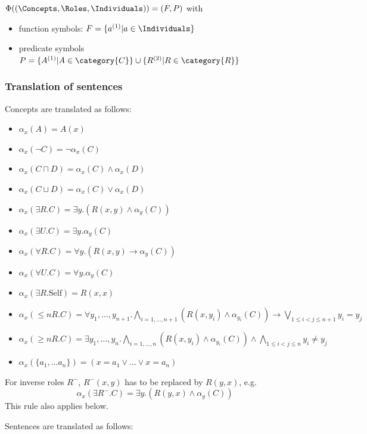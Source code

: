 \documentclass[10pt,fleqn,final]{scrreprt}
\newcommand{\sssclause}[1]{\subsubsection{#1}}
\begin{document}
 $\Phi((\Concepts, \Roles, \Individuals)) =  (F, P)$ with
\begin{itemize}
	\item function symbols: $F = \{a^{(1)} \vert a \in \Individuals\}$
	\item predicate symbols $P = \{A^{(1)} \vert A \in \category{C} \} \cup \{ R^{(2)} \vert R \in \category{R}\}$
\end{itemize}


\sssclause{Translation of sentences}

Concepts are translated as follows:
\begin{itemize}
 \item $\alpha_x(A) = A(x)$
 \item $\alpha_x(\lnot C) = \lnot \alpha_x (C)$
 \item $\alpha_x(C \sqcap D) = \alpha_x(C) \land \alpha_x(D)$
 \item $\alpha_x(C \sqcup D) = \alpha_x(C) \lor \alpha_x(D)$ 
 \item $\alpha_x(\exists R.C) = \exists y . (R(x,y) \land \alpha_y(C))$
 \item $\alpha_x(\exists U.C) = \exists y . \alpha_y(C)$
 \item $\alpha_x(\forall R.C) = \forall y . (R(x,y) \rightarrow \alpha_y(C))$
 \item $\alpha_x(\forall U.C) = \forall y . \alpha_y(C)$
 \item $\alpha_x(\exists R.\text{Self}) = R(x,x)$
 \item $\alpha_x(\leq n R. C) = \forall y_1,\ldots,y_{n+1} .  \bigwedge_{i=1,\ldots,n+1}(R(x,y_i) \land \alpha_{y_i}(C)) \rightarrow\bigvee_{1\leq i<j\leq n+1}y_i = y_j$
 \item $\alpha_x(\geq n R. C) = \exists y_1,\ldots,y_n . \bigwedge_{i=1,\ldots,n}(R(x,y_i) \land \alpha_{y_i}(C)) \wedge \bigwedge_{1\leq i<j\leq n}y_i\not= y_j $
 \item $\alpha_x(\{a_1, \ldots a_n \}) = (x=a_1\vee \ldots \vee x=a_n)$
\end{itemize}

For inverse roles $R^-$, $R^-(x,y)$ has to be replaced by $R(y,x)$, e.g.
 $$\alpha_x(\exists R^-.C) = \exists y . (R(y,x) \land \alpha_y(C))$$
This rule also applies below.


Sentences are translated as follows:
\end{document}
